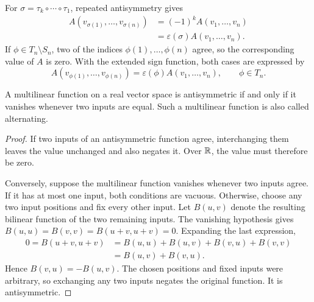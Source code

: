 For \(\sigma=\tau_k\circ\cdots\circ\tau_1\), repeated antisymmetry
gives
\[
  \begin{aligned}
    A(v_{\sigma(1)},\ldots,v_{\sigma(n)})
      &=(-1)^kA(v_1,\ldots,v_n)\\
      &=\varepsilon(\sigma)A(v_1,\ldots,v_n).
  \end{aligned}
\]
If \(\phi\in T_n\setminus S_n\), two of the indices
\(\phi(1),\ldots,\phi(n)\) agree, so the corresponding value of \(A\)
is zero. With the extended sign function, both cases are expressed by
\begin{equation}
  A(v_{\phi(1)},\ldots,v_{\phi(n)})
    =\varepsilon(\phi)A(v_1,\ldots,v_n),\qquad \phi\in T_n.
  \label{eq:linear-algebra-i:antisymmetric-reindexing}
\end{equation}

\begin{proposition}
  \label{thm:linear-algebra-i:alternating-antisymmetric}
  A multilinear function on a real vector space is antisymmetric if and
  only if it vanishes whenever two inputs are equal. Such a multilinear
  function is also called alternating.
\end{proposition}
\begin{pendingreview}
\begin{proof}
  If two inputs of an antisymmetric function agree, interchanging them
  leaves the value unchanged and also negates it. Over \(\mathbb{R}\), the value
  must therefore be zero.

  Conversely, suppose the multilinear function vanishes whenever two
  inputs agree. If it has at most one input, both conditions are vacuous.
  Otherwise, choose any two input positions and fix every other input.
  Let \(B(u,v)\) denote the resulting bilinear function of the two
  remaining inputs. The vanishing hypothesis gives
  \(B(u,u)=B(v,v)=B(u+v,u+v)=0\). Expanding the last expression,
  \[
    \begin{aligned}
      0=B(u+v,u+v)
        &=B(u,u)+B(u,v)+B(v,u)+B(v,v)\\
        &=B(u,v)+B(v,u).
    \end{aligned}
  \]
  Hence \(B(v,u)=-B(u,v)\). The chosen positions and fixed inputs were
  arbitrary, so exchanging any two inputs negates the original function.
  It is antisymmetric.
\end{proof}
\end{pendingreview}

